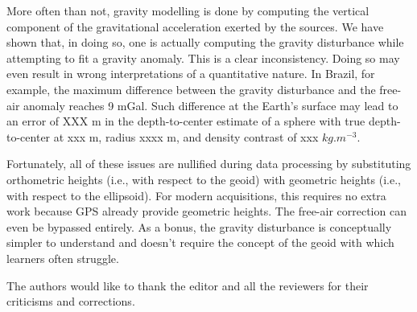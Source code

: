 \documentclass[extra]{gji}
\begin{document}
More often than not, gravity modelling is done by computing the
vertical component of the gravitational acceleration exerted by the sources.
We have shown that, in doing so, one is actually computing the gravity
disturbance while attempting to fit a gravity anomaly.
This is a clear inconsistency.
Doing so may even result in wrong interpretations of a quantitative nature.
In Brazil, for example, the maximum difference
between the gravity disturbance and the free-air anomaly reaches 9 mGal.
Such difference at the Earth's surface may lead to
an error of XXX m in the depth-to-center estimate of a sphere with
true depth-to-center at xxx m, radius xxxx m, and density
contrast of xxx $kg.m^{-3}$.

Fortunately, all of these issues are nullified during data processing by
substituting orthometric heights (i.e., with respect to the geoid) with
geometric heights (i.e., with respect to the ellipsoid).
For modern acquisitions, this requires no extra work because GPS already
provide geometric heights.
The free-air correction can even be bypassed entirely.
As a bonus, the gravity disturbance is conceptually simpler to understand and
doesn't require the concept of the geoid with which learners often struggle.


\begin{acknowledgments}
The authors would like to thank the editor and all the
reviewers for their criticisms and corrections.
\end{acknowledgments}





\appendix
%
%
%
%
\end{document}
